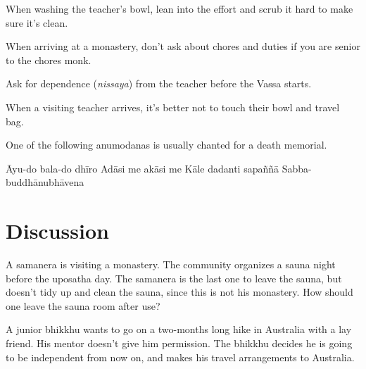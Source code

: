 \begin{exam}{\autoExamName}
\begin{problem*}
\begin{parts}
  \item {} When washing the teacher's bowl, lean into the effort and scrub
    it hard to make sure it's clean.

  \item {} When arriving at a monastery, don't ask about chores and duties
    if you are senior to the chores monk.

  \item {} Ask for dependence (\textit{nissaya}) from the teacher before the
    Vassa starts.

  \item {} When a visiting teacher arrives, it's better not to touch their
    bowl and travel bag.

\end{parts}

\end{problem*}

\clearpage

\begin{problem}

\item One of the following anumodanas is usually chanted for a death memorial.

  \bigskip

  \begin{answers}{1}
    \bChoices
     Āyu-do bala-do dhīro\eAns
     Adāsi me akāsi me\eAns
     Kāle dadanti sapaññā\eAns
     Sabba-buddhānubhāvena\eAns
    \eChoices
  \end{answers}

\end{problem}

\end{exam}

\section*{Discussion}

A samanera is visiting a monastery. The community organizes a sauna night before
the uposatha day. The samanera is the last one to leave the sauna, but doesn't
tidy up and clean the sauna, since this is not his monastery.
How should one leave the sauna room after use?

\bigskip

A junior bhikkhu wants to go on a two-months long hike in Australia with a lay
friend. His mentor doesn't give him permission. The bhikkhu decides he is going
to be independent from now on, and makes his travel arrangements to Australia.

